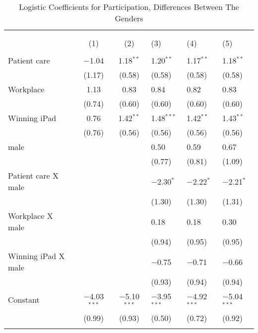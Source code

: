 
\begin{table}[!htbp] \centering 
  \caption{Logistic Coefficients for Participation, Differences Between The Genders} 
  \label{tab:gender} 
{\tiny 
\begin{tabular}{@{\extracolsep{0cm}}lccbbb} 
\\[-1.8ex]\hline 
\hline \\[-1.8ex] 
\\[-1.8ex] & (1) & (2) & (3) & (4) & (5)\\ 
\hline \\[-1.8ex] 
 Patient care & $-$1.04 & 1.18$^{**}$ & 1.20$^{**}$ & 1.17$^{**}$ & 1.18$^{**}$ \\ 
  & (1.17) & (0.58) & (0.58) & (0.58) & (0.58) \\ 
  Workplace & 1.13 & 0.83 & 0.84 & 0.82 & 0.83 \\ 
  & (0.74) & (0.60) & (0.60) & (0.60) & (0.60) \\ 
  Winning iPad & 0.76 & 1.42$^{**}$ & 1.48$^{***}$ & 1.42$^{**}$ & 1.43$^{**}$ \\ 
  & (0.76) & (0.56) & (0.56) & (0.56) & (0.56) \\ 
  male &  &  & 0.50 & 0.59 & 0.67 \\ 
  &  &  & (0.77) & (0.81) & (1.09) \\ 
  Patient care X male &  &  & $-$2.30$^{*}$ & $-$2.22$^{*}$ & $-$2.21$^{*}$ \\ 
  &  &  & (1.30) & (1.30) & (1.31) \\ 
  Workplace X male &  &  & 0.18 & 0.18 & 0.30 \\ 
  &  &  & (0.94) & (0.95) & (0.95) \\ 
  Winning iPad X male &  &  & $-$0.75 & $-$0.71 & $-$0.66 \\ 
  &  &  & (0.93) & (0.94) & (0.94) \\ 
  Constant & $-$4.03$^{***}$ & $-$5.10$^{***}$ & $-$3.95$^{***}$ & $-$4.92$^{***}$ & $-$5.04$^{***}$ \\ 
  & (0.99) & (0.93) & (0.50) & (0.72) & (0.92) \\ 
 \hline \\[-1.8ex] 

\end{tabular}}
\end{table}
